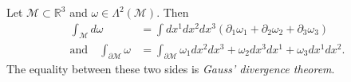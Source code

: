 \begin{example}[]
  Let $\mathcal{M} \subset \mathbb{R}^3$ and $\omega \in \Lambda^2 (\mathcal{M})$. Then 
  \begin{align}
    \int_{\mathcal{M}} d\omega &= \int dx^1 dx^2 dx^3 \left( \partial_1 \omega_1 + \partial_2 \omega_2 + \partial_3 \omega_3 \right) \\
    \text{and} \quad \int_{\partial \mathcal{M}} \omega &= \int_{\partial \mathcal{M}} \omega_1 dx^2 dx^3 + \omega_2 dx^3 dx^1 + \omega_3 dx^1 dx^2.
  \end{align}
  The equality between these two sides is \emph{Gauss' divergence theorem}.
\end{example}
